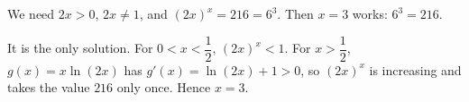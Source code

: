We need $2x>0$, $2x\ne1$, and $(2x)^x=216=6^3$. Then $x=3$ works: $6^3=216$.

It is the only solution. For $0<x<\dfrac{1}{2}$, $(2x)^x<1$. For $x>\dfrac{1}{2}$, $g(x)=x\ln(2x)$ has $g'(x)=\ln(2x)+1>0$, so $(2x)^x$ is increasing and takes the value $216$ only once. Hence $x=\boxed{3}$.

